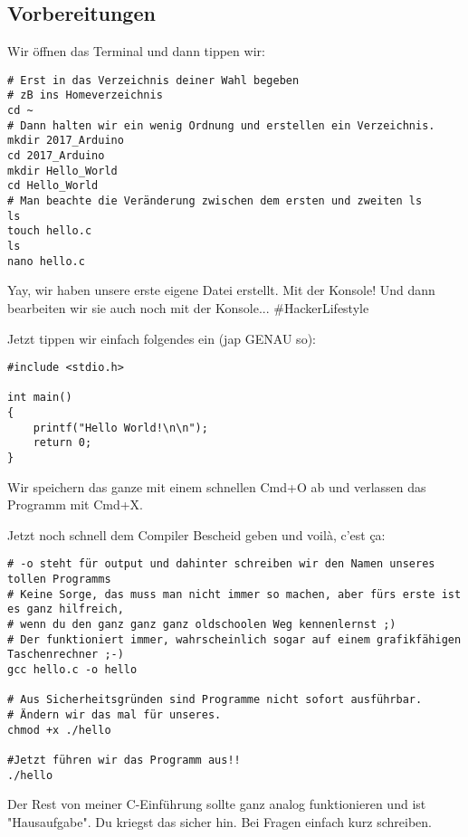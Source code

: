 \documentclass{article}
\begin{document}
\subsection{Vorbereitungen}

Wir öffnen das Terminal und dann tippen wir:

\begin{verbatim}
# Erst in das Verzeichnis deiner Wahl begeben
# zB ins Homeverzeichnis
cd ~
# Dann halten wir ein wenig Ordnung und erstellen ein Verzeichnis.
mkdir 2017_Arduino
cd 2017_Arduino
mkdir Hello_World
cd Hello_World
# Man beachte die Veränderung zwischen dem ersten und zweiten ls
ls
touch hello.c
ls
nano hello.c
\end{verbatim}

Yay, wir haben unsere erste eigene Datei erstellt. Mit der Konsole! Und dann bearbeiten wir sie auch noch mit der Konsole... \#HackerLifestyle

\bigskip

Jetzt tippen wir einfach folgendes ein (jap GENAU so):

\begin{verbatim}
#include <stdio.h>

int main()
{
	printf("Hello World!\n\n");
	return 0;
}
\end{verbatim}

Wir speichern das ganze mit einem schnellen Cmd+O ab und verlassen das Programm mit Cmd+X.

\bigskip

Jetzt noch schnell dem Compiler Bescheid geben und voilà, c'est ça:

\begin{verbatim}
# -o steht für output und dahinter schreiben wir den Namen unseres tollen Programms
# Keine Sorge, das muss man nicht immer so machen, aber fürs erste ist es ganz hilfreich,
# wenn du den ganz ganz ganz oldschoolen Weg kennenlernst ;) 
# Der funktioniert immer, wahrscheinlich sogar auf einem grafikfähigen Taschenrechner ;-)
gcc hello.c -o hello

# Aus Sicherheitsgründen sind Programme nicht sofort ausführbar.
# Ändern wir das mal für unseres.
chmod +x ./hello

#Jetzt führen wir das Programm aus!!
./hello
\end{verbatim}

Der Rest von meiner C-Einführung sollte ganz analog funktionieren und ist "Hausaufgabe". Du kriegst das sicher hin. Bei Fragen einfach kurz schreiben.
\end{document}
